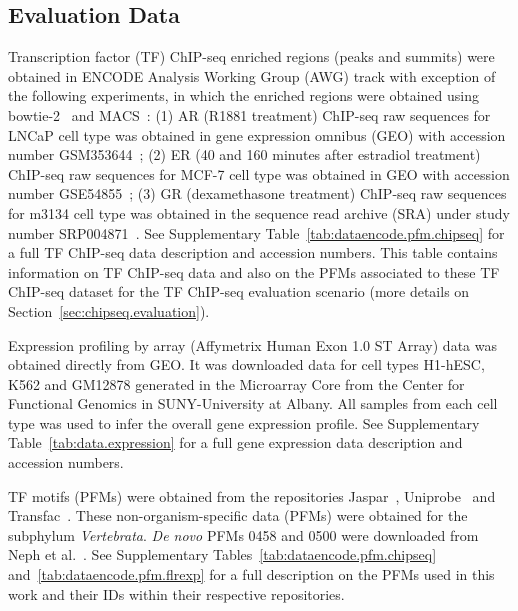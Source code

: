 \subsection{Evaluation Data}
\label{sec:evaluation.data}

Transcription factor (TF) ChIP-seq enriched regions (peaks and summits) were obtained in ENCODE Analysis Working Group (AWG) track with exception of the following experiments, in which the enriched regions were obtained using bowtie-2~\cite{langmead2012} and MACS~\cite{zhang2008}: (1) AR (R1881 treatment) ChIP-seq raw sequences for LNCaP cell type was obtained in gene expression omnibus (GEO) with accession number GSM353644~\cite{yu2010}; (2) ER (40 and 160 minutes after estradiol treatment) ChIP-seq raw sequences for MCF-7 cell type was obtained in GEO with accession number GSE54855~\cite{guertin2014}; (3) GR (dexamethasone treatment) ChIP-seq raw sequences for m3134 cell type was obtained in the sequence read archive (SRA) under study number SRP004871~\cite{john2011}. See Supplementary Table~\ref{tab:dataencode.pfm.chipseq} for a full TF ChIP-seq data description and accession numbers. This table contains information on TF ChIP-seq data and also on the PFMs associated to these TF ChIP-seq dataset for the TF ChIP-seq evaluation scenario (more details on Section~\ref{sec:chipseq.evaluation}).

Expression profiling by array (Affymetrix Human Exon 1.0 ST Array) data was obtained directly from GEO. It was downloaded data for cell types H1-hESC, K562 and GM12878 generated in the Microarray Core from the Center for Functional Genomics in SUNY-University at Albany. All samples from each cell type was used to infer the overall gene expression profile. See Supplementary Table~\ref{tab:data.expression} for a full gene expression data description and accession numbers.

TF motifs (PFMs) were obtained from the repositories Jaspar~\cite{mathelier2014}, Uniprobe~\cite{robasky2011} and Transfac~\cite{matys2006}. These non-organism-specific data (PFMs) were obtained for the subphylum \emph{Vertebrata}. \emph{De novo} PFMs 0458 and 0500 were downloaded from Neph et al.~\cite{neph2012a}. See Supplementary Tables~\ref{tab:dataencode.pfm.chipseq} and~\ref{tab:dataencode.pfm.flrexp} for a full description on the PFMs used in this work and their IDs within their respective repositories.

